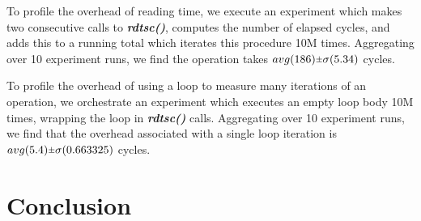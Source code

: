 \documentclass[sigconf]{acmart}
\newcommand{\rpm}{\raisebox{.2ex}{$\scriptstyle\pm$}}
\begin{document}
To profile the overhead of reading time, we execute an experiment which makes two consecutive calls to \textbf{\textit{rdtsc()}}, computes the number of elapsed cycles, and adds this to a running total which iterates this procedure 10M times. Aggregating over 10 experiment runs, we find the operation takes $avg(186) \rpm \sigma(5.34)$ cycles.

To profile the overhead of using a loop to measure many iterations of an operation, we 
orchestrate an experiment which executes an empty loop body 10M times, wrapping the loop in \textbf{\textit{rdtsc()}} calls. Aggregating over 10 experiment runs, we find that the overhead associated with a single loop iteration is $avg(5.4) \rpm \sigma(0.663325)$ cycles.

\section{Conclusion}


\begin{acks}

\end{acks}




\end{document}
